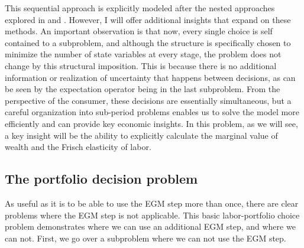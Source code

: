 \documentclass[\econtexRoot/SequentialEGM]{subfiles}
\begin{document}
This sequential approach is explicitly modeled after the nested approaches explored in  \cite{Clausen2020-zo} and \cite{Druedahl2021-wl}. However, I will offer additional insights that expand on these methods. An important observation is that now, every single choice is self contained to a subproblem, and although the structure is specifically chosen to minimize the number of state variables at every stage, the problem does not change by this structural imposition. This is because there is no additional information or realization of uncertainty that happens between decisions, as can be seen by the expectation operator being in the last subproblem. From the perspective of the consumer, these decisions are essentially simultaneous, but a careful organization into sub-period problems enables us to solve the model more efficiently and can provide key economic insights. In this problem, as we will see, a key insight will be the ability to explicitly calculate the marginal value of wealth and the Frisch elasticity of labor.

%

\subsection{The portfolio decision problem}

As useful as it is to be able to use the EGM step more than once, there are clear problems where the EGM step is not applicable. This basic labor-portfolio choice problem demonstrates where we can use an additional EGM step, and where we can not. First, we go over a subproblem where we can not use the EGM step.
\end{document}
